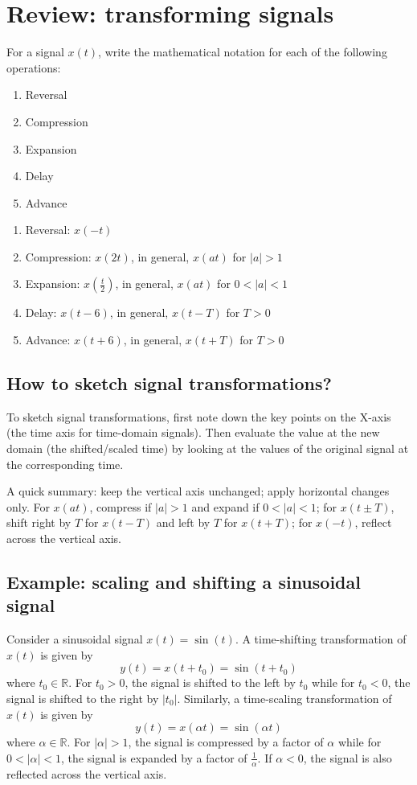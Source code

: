 \section{Review: transforming signals}
\begin{popquiz}
For a signal $x(t)$, write the mathematical notation for each of the following operations:
\begin{enumerate}
    \item Reversal 
    \item Compression
    \item Expansion
    \item Delay
    \item Advance
\end{enumerate}
\popqsplit

\begin{enumerate}
    \item Reversal: $x(-t)$
    \item Compression: $x(2t)$, in general, $x(at)$ for $|a|>1$
    \item Expansion: $x\!\left(\tfrac{t}{2}\right)$, in general, $x(at)$ for $0<|a|<1$
    \item Delay: $x(t-6)$, in general, $x(t-T)$ for $T>0$
    \item Advance: $x(t+6)$, in general, $x(t+T)$ for $T>0$
\end{enumerate}
\end{popquiz}


\subsection{How to sketch signal transformations?} 
To sketch signal transformations, first note down the key points on the X-axis (the time axis for time-domain signals). Then evaluate the value at the new domain (the shifted/scaled time) by looking at the values of the original signal at the corresponding time.

A quick summary: keep the vertical axis unchanged; apply horizontal changes only. For $x(at)$, compress if $|a|>1$ and expand if $0<|a|<1$; for $x(t\pm T)$, shift right by $T$ for $x(t-T)$ and left by $T$ for $x(t+T)$; for $x(-t)$, reflect across the vertical axis.

\subsection*{Example: scaling and shifting a sinusoidal signal}
Consider a sinusoidal signal $x(t) = \sin(t)$. A time-shifting transformation of $x(t)$ is given by
\[
y(t) = x(t + t_0) = \sin(t + t_0)
\]
where $t_0 \in \mathbb{R}$. For $t_0 > 0$, the signal is shifted to the left by $t_0$ while for $t_0 < 0$, the signal is shifted to the right by $|t_0|$. Similarly, a time-scaling transformation of $x(t)$ is given by
\[
y(t) = x(\alpha t) = \sin(\alpha t)
\]
where $\alpha \in \mathbb{R}$. For $|\alpha| > 1$, the signal is compressed by a factor of $\alpha$ while for $0 < |\alpha| < 1$, the signal is expanded by a factor of $\frac{1}{\alpha}$. If $\alpha < 0$, the signal is also reflected across the vertical axis.

